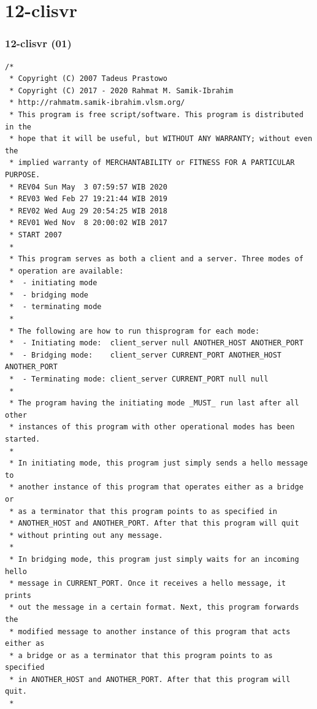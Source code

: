 \documentclass[xcolor=table, notheorems, hyperref={pdfpagelabels=false}]{beamer}
\begin{document}
\section{12-clisvr}
\begin{frame}[fragile]
\frametitle{12-clisvr (01)}
\begin{lstlisting}[basicstyle=\ttfamily\tiny]
/*
 * Copyright (C) 2007 Tadeus Prastowo
 * Copyright (C) 2017 - 2020 Rahmat M. Samik-Ibrahim
 * http://rahmatm.samik-ibrahim.vlsm.org/
 * This program is free script/software. This program is distributed in the 
 * hope that it will be useful, but WITHOUT ANY WARRANTY; without even the 
 * implied warranty of MERCHANTABILITY or FITNESS FOR A PARTICULAR PURPOSE.
 * REV04 Sun May  3 07:59:57 WIB 2020
 * REV03 Wed Feb 27 19:21:44 WIB 2019
 * REV02 Wed Aug 29 20:54:25 WIB 2018
 * REV01 Wed Nov  8 20:00:02 WIB 2017
 * START 2007
 *
 * This program serves as both a client and a server. Three modes of
 * operation are available:
 *  - initiating mode
 *  - bridging mode
 *  - terminating mode
 *
 * The following are how to run thisprogram for each mode:
 *  - Initiating mode:  client_server null ANOTHER_HOST ANOTHER_PORT
 *  - Bridging mode:    client_server CURRENT_PORT ANOTHER_HOST ANOTHER_PORT
 *  - Terminating mode: client_server CURRENT_PORT null null
 *
 * The program having the initiating mode _MUST_ run last after all other
 * instances of this program with other operational modes has been started.
 *
 * In initiating mode, this program just simply sends a hello message to
 * another instance of this program that operates either as a bridge or
 * as a terminator that this program points to as specified in
 * ANOTHER_HOST and ANOTHER_PORT. After that this program will quit
 * without printing out any message.
 *
 * In bridging mode, this program just simply waits for an incoming hello
 * message in CURRENT_PORT. Once it receives a hello message, it prints
 * out the message in a certain format. Next, this program forwards the
 * modified message to another instance of this program that acts either as
 * a bridge or as a terminator that this program points to as specified
 * in ANOTHER_HOST and ANOTHER_PORT. After that this program will quit.
 *

\end{lstlisting}
\end{frame}
\end{document}
